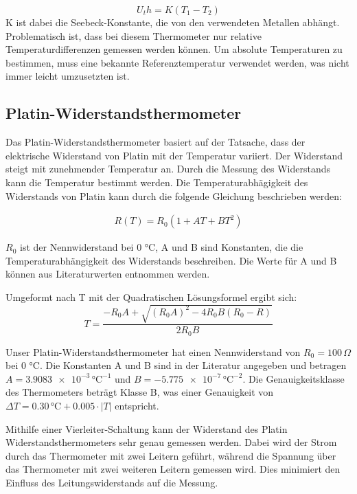 \documentclass[12pt,a4paper,titlepage]{scrartcl}
\numberwithin{equation}{section}
\numberwithin{table}{section}
\numberwithin{figure}{section}
\begin{document}
\begin{equation}
    U_th = K  (T_1 - T_2)
\end{equation}
K ist dabei die Seebeck-Konstante, die von den verwendeten Metallen abhängt.
Problematisch ist, dass bei diesem Thermometer nur relative Temperaturdifferenzen gemessen werden können. Um absolute Temperaturen zu bestimmen, muss eine bekannte Referenztemperatur verwendet werden, was nicht immer leicht umzusetzten ist.

\subsection{Platin-Widerstandsthermometer}
Das Platin-Widerstandsthermometer basiert auf der Tatsache, dass der elektrische Widerstand von Platin mit der Temperatur variiert. Der Widerstand steigt mit zunehmender Temperatur an. Durch die Messung des Widerstands kann die Temperatur bestimmt werden.
Die Temperaturabhägigkeit des Widerstands von Platin kann durch die folgende Gleichung beschrieben werden:

\begin{align}
    R(T) = R_0  (1 + AT + BT^2)
\end{align}

$R_0$ ist der Nennwiderstand bei 0 °C, A und B sind Konstanten, die die Temperaturabhängigkeit des Widerstands beschreiben. Die Werte für A und B können aus Literaturwerten entnommen werden.

Umgeformt nach T mit der Quadratischen Lösungsformel ergibt sich:
\begin{equation}
    T = \frac{-R_0  A + \sqrt{(R_0  A)^2 - 4  R_0  B  (R_0 - R)}}{2  R_0  B}
\end{equation}

Unser Platin-Widerstandsthermometer hat einen Nennwiderstand von $R_0 = 100\,\Omega$ bei 0 °C. Die Konstanten A und B sind in der Literatur angegeben und betragen $A = \num{3.9083e-3}\,\si{\degreeCelsius}^{-1}$ und $B = \num{-5.775e-7}\,\si{\degreeCelsius}^{-2}$. Die Genauigkeitsklasse des Thermometers beträgt Klasse B, was einer Genauigkeit von $\Delta T = 0.30\,\si{\degreeCelsius} + 0.005 \cdot \lvert T \rvert$ entspricht.

Mithilfe einer Vierleiter-Schaltung kann der Widerstand des Platin Widerstandsthermometers sehr genau gemessen werden. Dabei wird der Strom durch das Thermometer mit zwei Leitern geführt, während die Spannung über das Thermometer mit zwei weiteren Leitern gemessen wird. Dies minimiert den Einfluss des Leitungswiderstands auf die Messung.
\end{document}
